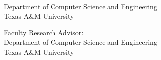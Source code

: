\begin{singlespace}

\begin{center}


\tamumanuscripttitle
\vspace{3em}


\tamufullname\\
Department of Computer Science and Engineering\\
Texas A\&M University
\vspace{3em}


Faculty Research Advisor: \tamuadvisor
\\
Department of Computer Science and Engineering
\\
Texas A\&M University

\vspace{3em}

\end{center}
\end{singlespace}

